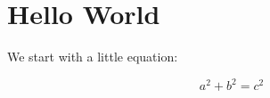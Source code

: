 \documentclass[11pt]{article}
\begin{document}
\section{Hello World}

We start with a little equation:

\begin{equation}
	a^2 + b^2 = c^2
\end{equation}
\end{document}
